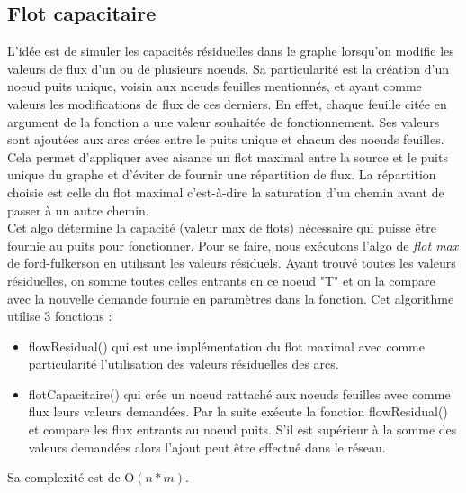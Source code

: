 \documentclass[onecolumn, 12pt]{article}
\begin{document}
\subsection{ Flot capacitaire}
L'id\'ee est de simuler les capacit\'es r\'esiduelles dans le graphe lorsqu'on modifie les valeurs de flux d'un ou de plusieurs noeuds. Sa particularit\'e est la cr\'eation d'un noeud puits unique, voisin aux noeuds feuilles mentionn\'es, et ayant comme valeurs les modifications de flux de ces derniers. En effet, chaque feuille cit\'ee en argument de la fonction a une valeur souhait\'ee de fonctionnement. Ses valeurs sont ajout\'ees aux arcs cr\'ees entre le puits unique et chacun des noeuds feuilles. Cela permet d'appliquer avec aisance un flot maximal entre la source et le puits unique  du graphe et d'\'eviter de fournir une r\'epartition de flux. La r\'epartition choisie est celle du flot maximal c'est-\`a-dire la saturation d'un chemin avant de passer \`a un autre chemin.\\
Cet algo d\'etermine la capacit\'e (valeur max de flots) n\'ecessaire qui puisse \^etre fournie au puits pour fonctionner. Pour se faire, nous ex\'ecutons l'algo de \emph{flot max} de ford-fulkerson en utilisant les valeurs r\'esiduels.  
Ayant trouv\'e toutes les valeurs r\'esiduelles, on somme toutes celles entrants en ce noeud "T" et on la compare avec la nouvelle demande fournie en param\`etres dans la fonction. 
Cet algorithme utilise 3 fonctions :
\begin{itemize}
\item flowResidual() qui est une impl\'ementation du flot maximal avec comme particularit\'e l'utilisation des valeurs r\'esiduelles des arcs.
\item flotCapacitaire() qui cr\'ee un noeud rattach\'e aux noeuds feuilles avec comme flux leurs valeurs demand\'ees. Par la suite ex\'ecute la fonction flowResidual() et compare les flux entrants au noeud puits. S'il est sup\'erieur \`a la somme des valeurs demand\'ees alors l'ajout peut \^etre effectu\'e dans le r\'eseau.
\end{itemize}
 Sa complexit\'e est de  $\mathrm{O}{(n*m)}$.
\end{document}
